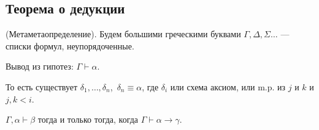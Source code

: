 \subsection{Теорема о дедукции}

\begin{definition}
    (Метаметаопределение).
    Будем большими греческими буквами $\Gamma, \Delta, \Sigma\ldots$ --- списки формул, неупорядоченные.
\end{definition}

\begin{definition}
    Вывод из гипотез: $\Gamma \vdash \alpha$.

    То есть существует $\delta_1,\dots, \delta_n$,~$\delta_n \equiv \alpha$, где $\delta_i$ или схема аксиом, или m.p. из $j$ и $k$ и $j, k < i$.
\end{definition}

\begin{theorem}
    $ \Gamma, \alpha \vdash \beta$ тогда и только тогда, когда $\Gamma \vdash \alpha \to \gamma$.
\end{theorem}

